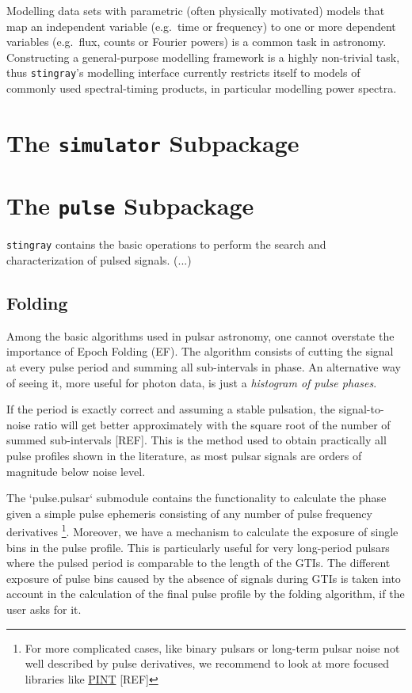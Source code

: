 \documentclass[12pt]{emulateapj}
\newcommand{\stingray}{\texttt{stingray}\xspace}
\begin{document}
Modelling data sets with parametric (often physically motivated) models that map an independent variable (e.g.\ time or frequency) to one or more dependent variables (e.g.\ flux, counts or Fourier powers) is a common task in astronomy. Constructing a general-purpose modelling framework is a highly non-trivial task, thus \stingray's modelling interface currently restricts itself to models of commonly used spectral-timing products, in particular modelling power spectra. 




\section{The \texttt{simulator} Subpackage}
\label{sec:simulator}

\section{The \texttt{pulse} Subpackage}
\label{sec:pulsar}
\stingray contains the basic operations to perform the search and characterization of pulsed signals.
(...)
\subsection{Folding}
Among the basic algorithms used in pulsar astronomy, one cannot overstate the importance of Epoch Folding (EF).
The algorithm consists of cutting the signal at every pulse period and summing all sub-intervals in phase. 
An alternative way of seeing it, more useful for photon data, is just a \textit {histogram of pulse phases}.

If the period is exactly correct and assuming a stable pulsation, the signal-to-noise ratio will get better approximately with the square root of the number of summed sub-intervals [REF].
This is the method used to obtain practically all pulse profiles shown in the literature, as most pulsar signals are orders of magnitude below noise level.

The `pulse.pulsar` submodule contains the functionality to calculate the phase given a simple pulse ephemeris consisting of any number of pulse frequency derivatives%
\footnote{For more complicated cases, like binary pulsars or long-term pulsar noise not well described by pulse derivatives, we recommend to look at more focused libraries like \href{https://github.com/nanograv/PINT}{PINT} [REF]}.
Moreover, we have a mechanism to calculate the exposure of single bins in the pulse profile. 
This is particularly useful for very long-period pulsars where the pulsed period is comparable to the length of the GTIs.
The different exposure of pulse bins caused by the absence of signals during GTIs is taken into account in the calculation of the final pulse profile by the folding algorithm, if the user asks for it. 
\end{document}

